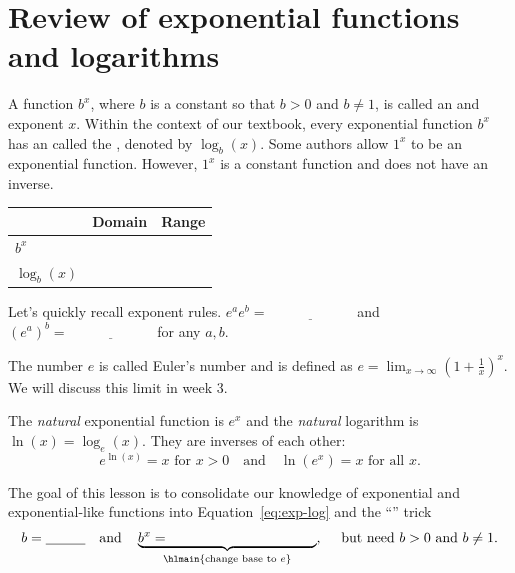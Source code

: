 \documentclass[../main.tex]{subfiles}
\begin{document}
 \section{Review of exponential functions and logarithms}
A function \(b^{x}\), where \(b\) is a constant so that \(b > 0\) and \(b \ne 1\), is called an  and exponent \(x\). Within the context of our textbook, every exponential function \(b^{x}\) has an  called the , denoted by \(\log_{b}(x)\). \newline
{\scriptsize Some authors allow \(1^{x}\) to be an exponential function. However, \(1^{x}\) is a constant function and does not have an inverse.}

\begin{minipage}{0.6\textwidth}
  \centering
  \begin{tabular}{l|p{1in}|p{1in}}
    & Domain & Range \\\midrule
    \(b^{x}\) & & \\[2ex]\midrule
    \(\log_{b}(x)\) & & \\[2ex]
  \end{tabular}
\end{minipage}
\begin{minipage}{0.4\textwidth}
  \centering
  
\end{minipage}

Let's quickly recall exponent rules. \(e^{a}e^{b} = \underline{\hspace{1in}}\) and \((e^{a})^{b} = \underline{\hspace{1in}}\) for any \(a,b\).

The number \(e\) is called Euler's number and is defined as \(e = \lim_{x \to \infty} \left( 1 + \frac{1}{x} \right)^{x}\). We will discuss this limit in week 3.
\bigskip

\begin{definition} \label{def:exp-ln}
  The \emph{natural} exponential function is \(e^{x}\) and the \emph{natural} logarithm is \(\ln(x) = \log_{e}(x)\).  They are inverses of each other:
  \begin{equation} \label{eq:exp-log}
    e^{\ln(x)} = x \text{ for \(x > 0\)} \quad\text{and}\quad \ln(e^{x}) = x \text{ for all \(x\)}.
  \end{equation}
\end{definition}

\faStar{} The goal of this lesson is to consolidate our knowledge of exponential and exponential-like functions into Equation~\eqref{eq:exp-log} and the ``'' trick
\begin{equation} \label{eq:exp-change-of-base}
  b = \underline{\hspace{1cm}} \quad\text{and}\quad \underbrace{b^{x} = \hspace{1.5in}}_{\text{\hlmain{change base to \(e\)}}}, \quad\text{ but need } b > 0 \text{ and } b \ne 1.
\end{equation}
\end{document}

